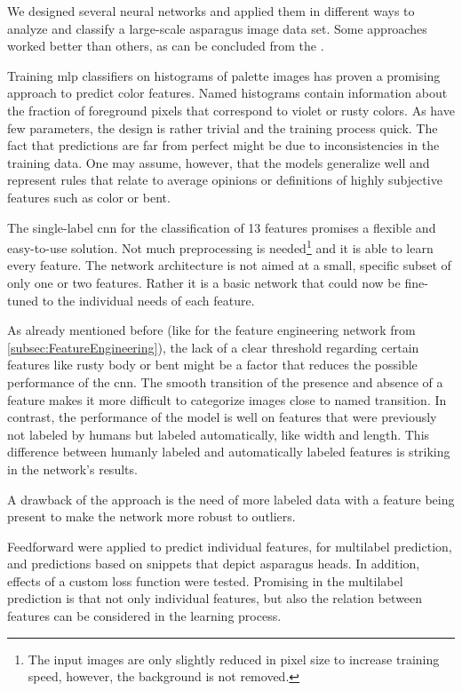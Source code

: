 We designed several neural networks and applied them in different ways to analyze and classify a large-scale asparagus image data set. Some approaches worked better than others, as can be concluded from the .

\bigskip
Training \acrshort{mlp} classifiers on histograms of palette images has proven a promising approach to predict color features. Named histograms contain information about the fraction of foreground pixels that correspond to violet or rusty colors. As  have few parameters, the design is rather trivial and the training process quick. The fact that predictions are far from perfect might be due to inconsistencies in the training data. One may assume, however, that the models generalize well and represent rules that relate to average opinions or definitions of highly subjective features such as color or bent.

\bigskip
The single-label \acrshort{cnn} for the classification of 13 features promises a flexible and easy-to-use solution. Not much preprocessing is needed\footnote{The input images are only slightly reduced in pixel size to increase training speed, however, the background is not removed.} and it is able to learn every feature. The network architecture is not aimed at a small, specific subset of only one or two features. Rather it is a basic network that could now be fine-tuned to the individual needs of each feature.

As already mentioned before (like for the feature engineering network from \autoref{subsec:FeatureEngineering}), the lack of a clear threshold regarding certain features like rusty body or bent might be a factor that reduces the possible performance of the \acrshort{cnn}. The smooth transition of the presence and absence of a feature makes it more difficult to categorize images close to named transition. In contrast, the performance of the model is well on features that were previously not labeled by humans but labeled automatically, like width and length. This difference between humanly labeled and automatically labeled features is striking in the network’s results.

A drawback of the approach is the need of more labeled data with a feature being present to make the network more robust to outliers.


\bigskip
Feedforward   were applied to predict individual features, for multilabel prediction, and predictions based on snippets that depict asparagus heads. In addition, effects of a custom loss function were tested. Promising in the multilabel prediction is that not only individual features, but also the relation between features can be considered in the learning process.

